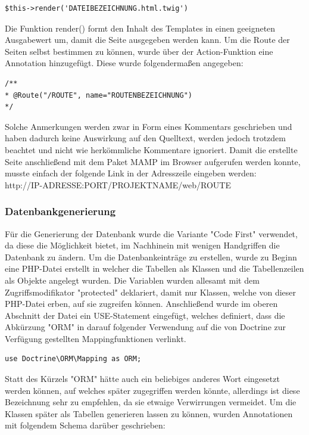	\lstset{language=php}
  	\begin{lstlisting}
$this->render('DATEIBEZEICHNUNG.html.twig')
  	\end{lstlisting}
Die Funktion render() formt den Inhalt des Templates in einen geeigneten Ausgabewert um, damit die Seite ausgegeben werden kann.
Um die Route der Seiten selbst bestimmen zu können, wurde über der Action-Funktion eine Annotation hinzugefügt. Diese wurde folgendermaßen angegeben:
	\lstset{language=php}
  	\begin{lstlisting}
/**
* @Route("/ROUTE", name="ROUTENBEZEICHNUNG")
*/
  	\end{lstlisting}
Solche Anmerkungen werden zwar in Form eines Kommentars geschrieben und haben dadurch keine Auswirkung auf den Quelltext, werden jedoch trotzdem beachtet und nicht wie herkömmliche Kommentare ignoriert.
Damit die erstellte Seite anschließend mit dem Paket MAMP im Browser aufgerufen werden konnte, musste einfach der folgende Link in der Adresszeile eingeben werden:\\
http://IP-ADRESSE:PORT/PROJEKTNAME/web/ROUTE

    \subsubsection{Datenbankgenerierung}

Für die Generierung der Datenbank wurde die Variante "Code First" verwendet, da diese die Möglichkeit bietet, im Nachhinein mit wenigen Handgriffen die Datenbank zu ändern.
Um die Datenbankeinträge zu erstellen, wurde zu Beginn eine PHP-Datei erstellt in welcher die Tabellen als Klassen und die Tabellenzeilen als Objekte angelegt wurden. Die Variablen wurden allesamt mit dem Zugriffsmodifikator "protected" deklariert, damit nur Klassen, welche von dieser PHP-Datei erben, auf sie zugreifen können. Anschließend wurde im oberen Abschnitt der Datei ein USE-Statement eingefügt, welches definiert, dass die Abkürzung "ORM" in darauf folgender Verwendung auf die von Doctrine zur Verfügung gestellten Mappingfunktionen verlinkt.
	
	\lstset{language=php}
  	\begin{lstlisting}
use Doctrine\ORM\Mapping as ORM;
  	\end{lstlisting}
Statt des Kürzels "ORM" hätte auch ein beliebiges anderes Wort eingesetzt werden können, auf welches später zugegriffen werden könnte, allerdings ist diese Bezeichnung sehr zu empfehlen, da sie etwaige Verwirrungen vermeidet.
Um die Klassen später als Tabellen generieren lassen zu können, wurden Annotationen mit folgendem Schema darüber geschrieben:
	
